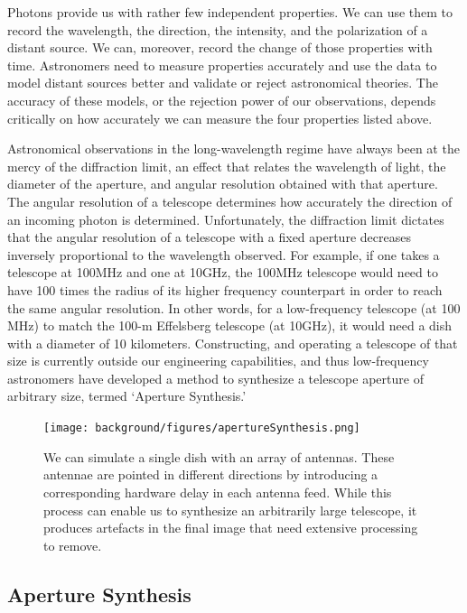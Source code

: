 Photons provide us with rather few independent properties. We can use them to record the wavelength, the direction, the intensity, and the polarization of a distant source. We can, moreover, record the change of those properties with time. Astronomers need to measure properties accurately and use the data to model distant sources  better and validate or reject astronomical theories. The accuracy of these models, or the rejection power of our observations, depends critically on how accurately we can measure the four properties listed above. 

Astronomical observations in the long-wavelength regime have always been at the mercy of the diffraction limit, an effect that relates the wavelength of light, the diameter of the aperture, and angular resolution obtained with that aperture. The angular resolution of a telescope determines how accurately the direction of an incoming photon is determined. Unfortunately, the diffraction limit dictates that the angular resolution of a telescope with a fixed aperture decreases inversely proportional to the wavelength observed. For example, if one takes a telescope at 100MHz and one at 10GHz, the 100MHz telescope would need to have 100 times the radius of its higher frequency counterpart in order to reach the same angular resolution. In other words, for a low-frequency telescope (at 100 MHz) to match the 100-m Effelsberg telescope (at 10GHz), it would need a dish with a diameter of 10 kilometers. Constructing, and operating a telescope of that size is currently outside our engineering capabilities, and thus low-frequency astronomers have developed a method to synthesize a telescope aperture of arbitrary size, termed `Aperture Synthesis.' 

\begin{figure}[h]
    \centering
    \texttt{[image: background/figures/apertureSynthesis.png]}
    \caption[Graphical representation of aperture synthesis]{We can simulate a single dish with an array of antennas. These antennae are pointed in different directions by introducing a corresponding hardware delay in each antenna feed. While this process can enable us to synthesize an arbitrarily large telescope, it produces artefacts in the final image that need extensive processing to remove. }
    \label{fig:aperture_synthesis}
\end{figure}


\subsection{Aperture Synthesis}

